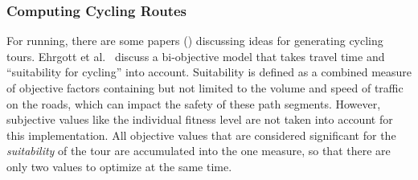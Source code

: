 %
%


\subsubsection{Computing Cycling Routes}
\label{subsubsec:cyclingRoutes}

For running, there are some papers (\cite{ehrgott_bi-objective_2012, verbeeck_extension_2014}) discussing ideas for generating cycling tours.
Ehrgott et al.\ \cite{ehrgott_bi-objective_2012}  discuss a bi-objective model that takes travel time and \enquote{suitability for cycling} into account.
Suitability is defined as a combined measure of objective factors containing but not limited to the volume and speed of traffic on the roads, which can impact the safety of these path segments. 
However, subjective values like the individual fitness level are not taken into account for this implementation.
All objective values that are considered significant for the \textit{suitability} of the tour are accumulated into the one measure, so that there are only two values to optimize at the same time. 

